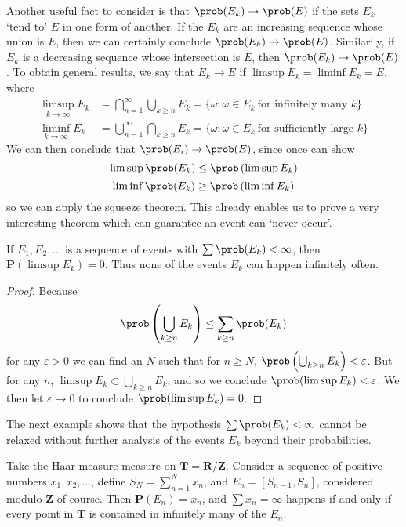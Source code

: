 Another useful fact to consider is that $\prob(E_k) \to \prob(E)$ if the sets $E_k$ `tend to' $E$ in one form of another. If the $E_k$ are an increasing sequence whose union is $E$, then we can certainly conclude $\prob(E_k) \to \prob(E)$. Similarily, if $E_k$ is a decreasing sequence whose intersection is $E$, then $\prob(E_k) \to \prob(E)$. To obtain general results, we say that $E_k \to E$ if $\limsup E_k = \liminf E_k = E$, where
%
\begin{align*}
    \limsup_{k \to \infty} E_k &= \bigcap_{n = 1}^\infty \bigcup_{k \geq n} E_k = \{ \omega : \omega \in E_k\ \text{for infinitely many $k$} \}\\
    \liminf_{k \to \infty} E_k &= \bigcup_{n = 1}^\infty \bigcap_{k \geq n} E_k = \{ \omega: \omega \in E_k\ \text{for sufficiently large $k$} \}
\end{align*}
%
We can then conclude that $\prob(E_i) \to \prob(E)$, since once can show
%
\[ \limsup \prob(E_k) \leq \prob \left( \limsup E_k \right) \]
\[ \liminf \prob(E_k) \geq \prob \left( \liminf E_k \right) \]
%
so we can apply the squeeze theorem. This already enables us to prove a very interesting theorem which can guarantee an event can `never occur'.

\begin{lemma}
    If $E_1, E_2, \dots$ is a sequence of events with $\sum \prob(E_k) < \infty$, then $\mathbf{P} \left( \limsup E_k \right) = 0$. Thus none of the events $E_k$ can happen infinitely often.
\end{lemma}
\begin{proof}
    Because
    \[ \prob \left( \bigcup_{k \geq n} E_k \right) \leq \sum_{k \geq n} \prob(E_k) \]
    for any $\varepsilon > 0$ we can find an $N$ such that for $n \geq N$, $\prob \left( \bigcup_{k \geq n} E_k \right) < \varepsilon$. But for any $n$, $\limsup E_k \subset \bigcup_{k \geq n} E_k$, and so we conclude $\prob(\limsup E_k) < \varepsilon$. We then let $\varepsilon \to 0$ to conclude $\prob(\limsup E_k) = 0$.
\end{proof}

The next example shows that the hypothesis $\sum \prob(E_k) < \infty$ cannot be relaxed without further analysis of the events $E_k$ beyond their probabilities.

\begin{example}
    Take the Haar measure measure on $\mathbf{T} = \mathbf{R}/\mathbf{Z}$. Consider a sequence of positive numbers $x_1, x_2, \dots$, define $S_N = \sum_{n = 1}^N x_n$, and $E_n = [S_{n-1},S_n]$, considered modulo $\mathbf{Z}$ of course. Then $\mathbf{P}(E_n) = x_n$, and $\sum x_n = \infty$ happens if and only if every point in $\mathbf{T}$ is contained in infinitely many of the $E_n$.
\end{example}

